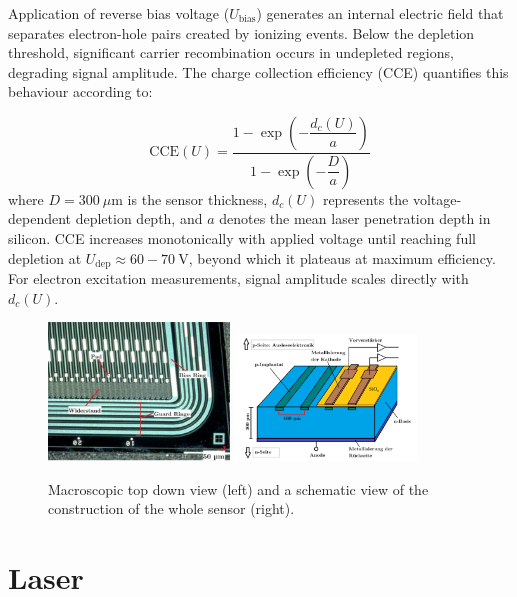 Application of reverse bias voltage ($U_{\mathrm{bias}}$) generates an internal electric field that separates electron-hole pairs created by ionizing events. Below the depletion threshold, significant carrier recombination occurs in undepleted regions, degrading signal amplitude. The charge collection efficiency (CCE) quantifies this behaviour according to:

\begin{equation}
    \mathrm{CCE}(U) = \frac{1 - \exp\left(-\dfrac{d_c(U)}{a}\right)}{1 - \exp\left(-\dfrac{D}{a}\right)} \label{eq:fitdepl}
\end{equation}
where $D = 300\ \mu\mathrm{m}$ is the sensor thickness, $d_c(U)$ represents the voltage-dependent depletion depth, and $a$ denotes the mean laser penetration depth in silicon. CCE increases monotonically with applied voltage until reaching full depletion at $U_{\mathrm{dep}} \approx 60-70\ \mathrm{V}$, beyond which it plateaus at maximum efficiency. For electron excitation measurements, signal amplitude scales directly with $d_c(U)$.

\begin{figure}[H]
	\centering
        \includegraphics[width=0.43\textwidth]{pictures/detector3.png}
        \includegraphics[width=0.43\textwidth]{pictures/detector4.png}
	\caption{Macroscopic top down view (left) and a schematic view of the construction of the whole sensor (right).}
        \label{fig:detector2}   
\end{figure}
\section{Laser}

